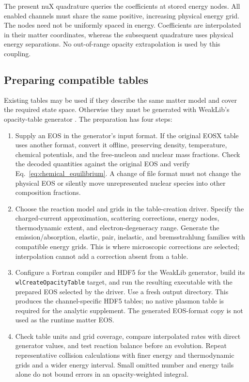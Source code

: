 \documentclass[aps,prd,reprint,nofootinbib,notitlepage]{revtex4-2}
\begin{document}
The present nuX quadrature queries the coefficients at stored energy
nodes. All enabled channels must share the same positive, increasing
physical energy grid. The nodes need not be uniformly spaced in energy.
Coefficients are interpolated in their matter coordinates, whereas the
subsequent quadrature uses physical energy separations. No out-of-range
opacity extrapolation is used by this coupling.

\subsection{Preparing compatible tables}

Existing tables may be used if they describe the same matter model and
cover the required state space. Otherwise they must be generated with
WeakLib's opacity-table generator \cite{WeakLibTables}. The preparation
has four steps:
\begin{enumerate}
 \item Supply an EOS in the generator's input format. If the original
 EOSX table uses another format, convert it offline, preserving density,
 temperature, chemical potentials, and the free-nucleon and nuclear mass
 fractions. Check the decoded quantities against the original EOS and
 verify Eq.~\eqref{eq:chemical_equilibrium}. A change of file format must
 not change the physical EOS or silently move unrepresented nuclear
 species into other composition fractions.

 \item Choose the reaction model and grids in the table-creation driver.
 Specify the charged-current approximation, scattering corrections,
 energy nodes, thermodynamic extent, and electron-degeneracy range.
 Generate the emission/absorption, elastic, pair, inelastic, and
 bremsstrahlung families with compatible energy grids. This is where
 microscopic corrections are selected; interpolation cannot add a
 correction absent from a table.

 \item Configure a Fortran compiler and HDF5 for the WeakLib generator,
 build its \texttt{wlCreateOpacityTable} target, and run the resulting
 executable with the prepared EOS selected by the driver. Use a fresh
 output directory. This produces the channel-specific HDF5 tables;
 no native plasmon table is required for the analytic supplement.
 The generated EOS-format copy is not used as the runtime matter EOS.

 \item Check table units and grid coverage, compare interpolated rates
 with direct generator values, and test reaction balance before an
 evolution. Repeat representative collision calculations with finer
 energy and thermodynamic grids and a wider energy interval. Small
 omitted number and energy tails alone do not bound errors in an
 opacity-weighted integral.
\end{enumerate}
\end{document}
